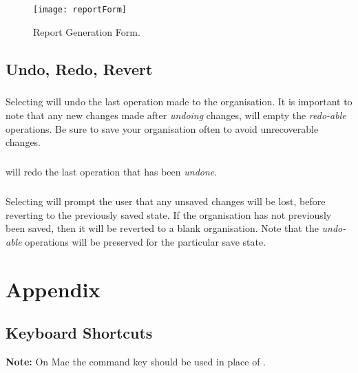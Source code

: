 \documentclass[11pt,fleqn]{book} %
\begin{document}
\begin{figure}[H]
  \centering
  \texttt{[image: reportForm]}
  \caption{Report Generation Form.\label{reportForm}}
\end{figure}

\section{Undo, Redo, Revert}
\paragraph{}
Selecting  will undo the last operation made to the organisation. It is important to note that any
new changes made after \textit{undoing} changes, will empty the
\textit{redo-able} operations. Be sure to save your organisation often to avoid
unrecoverable changes.

\paragraph{}
 will redo the last operation that has been \textit{undone}.

\paragraph{}
Selecting  will prompt the user that any unsaved changes will be lost, before reverting
to the previously saved state. If the organisation has not previously been saved, then it will be reverted
to a blank organisation. Note that the \textit{undo-able} operations will be preserved for the particular save state.




\appendix
\chapter{Appendix}
\clearpage

\section{Keyboard Shortcuts}

\textbf{Note:} On Mac the command key \keys{\cmd} should be used
  in place of \keys{\ctrl}.
\end{document}
